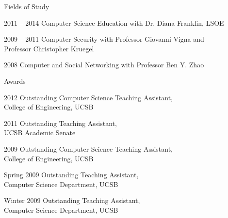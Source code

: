\begin{vitae}
{\begin{vitaesection}{Fields of Study}
\vspace{-0.1cm}
  \item [2011 -- 2014] Computer Science Education with Dr. Diana Franklin, LSOE
  \item [2009 -- 2011] Computer Security with Professor Giovanni Vigna
    and\\ Professor Christopher Kruegel
  \item [2008] Computer and Social Networking with Professor Ben Y. Zhao
\end{vitaesection}

\begin{vitaesection}{Awards}
\vspace{-0.1cm}
  \item [2012] Outstanding Computer Science Teaching Assistant,\\ College of
    Engineering, UCSB
  \item [2011] Outstanding Teaching Assistant,\\ UCSB Academic Senate
  \item [2009] Outstanding Computer Science Teaching Assistant,\\ College of
    Engineering, UCSB
  \item [Spring 2009] Outstanding Teaching Assistant,\\ Computer Science
    Department, UCSB
  \item [Winter 2009] Outstanding Teaching Assistant,\\ Computer Science
    Department, UCSB
\end{vitaesection}

}
\end{vitae}
